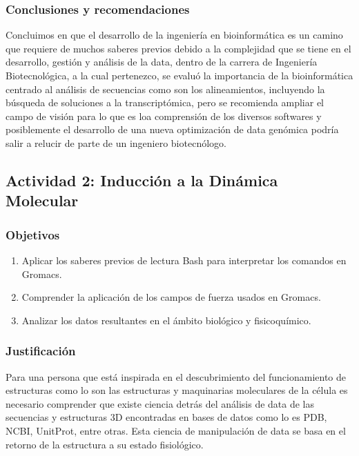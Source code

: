 \documentclass[a4paper, 12pt]{article}
\begin{document}
           
        \subsubsection{Conclusiones y recomendaciones}
        Concluimos en que el desarrollo de la ingeniería en bioinformática es un camino que requiere de muchos saberes previos debido a la complejidad que se tiene en el desarrollo, gestión y análisis de la data, dentro de la carrera de Ingeniería Biotecnológica, a la cual pertenezco, se evaluó la importancia de la bioinformática centrado al análisis de secuencias como son los alineamientos, incluyendo la búsqueda de soluciones a la transcriptómica, pero se recomienda ampliar el campo de visión para lo que es loa comprensión de los diversos softwares y posiblemente el desarrollo de una nueva optimización de data genómica podría salir a relucir de parte de un ingeniero biotecnólogo.

    \subsection{Actividad 2: Inducción a la Dinámica Molecular}

         \subsubsection{Objetivos} 
            \begin{enumerate}
                \item Aplicar los saberes previos de lectura Bash para interpretar los comandos en Gromacs.
                \item Comprender la aplicación de los campos de fuerza usados en Gromacs.
                \item Analizar los datos resultantes en el ámbito biológico y fisicoquímico.
            \end{enumerate}

         \subsubsection{Justificación}
         Para una persona que está inspirada en el descubrimiento del funcionamiento de estructuras como lo son las estructuras y maquinarias moleculares de la célula es necesario comprender que existe ciencia detrás del análisis de data de las secuencias y estructuras 3D encontradas en bases de datos como lo es PDB, NCBI, UnitProt, entre otras. Esta ciencia de manipulación de data se basa en el retorno de la estructura a su estado fisiológico.
         
\end{document}
